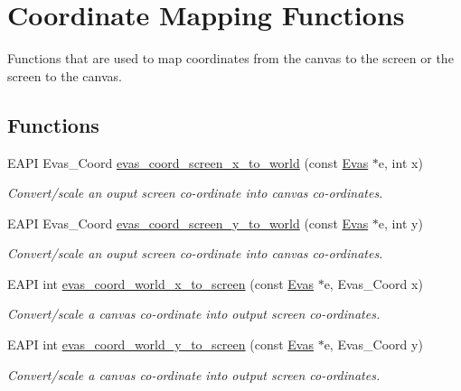 \section{Coordinate Mapping Functions}
\label{group__Evas__Coord__Mapping__Group}


Functions that are used to map coordinates from the canvas to the screen or the screen to the canvas.  


\subsection*{Functions}
\begin{DoxyCompactItemize}
\item 
EAPI Evas\_\-Coord \hyperlink{group__Evas__Coord__Mapping__Group_gab435c4e98554a4c6b934840a38d96051}{evas\_\-coord\_\-screen\_\-x\_\-to\_\-world} (const \hyperlink{group__Evas__Canvas_ga5ff87cc4ce6bc43e3b640a6d37f73043}{Evas} $\ast$e, int x)
\begin{DoxyCompactList}\small\item\em Convert/scale an ouput screen co-\/ordinate into canvas co-\/ordinates. \item\end{DoxyCompactList}\item 
EAPI Evas\_\-Coord \hyperlink{group__Evas__Coord__Mapping__Group_gac69db230ec0bd06f683e62665abe5df2}{evas\_\-coord\_\-screen\_\-y\_\-to\_\-world} (const \hyperlink{group__Evas__Canvas_ga5ff87cc4ce6bc43e3b640a6d37f73043}{Evas} $\ast$e, int y)
\begin{DoxyCompactList}\small\item\em Convert/scale an ouput screen co-\/ordinate into canvas co-\/ordinates. \item\end{DoxyCompactList}\item 
EAPI int \hyperlink{group__Evas__Coord__Mapping__Group_ga3e4f9f6af852df00de8c180f2e3919e9}{evas\_\-coord\_\-world\_\-x\_\-to\_\-screen} (const \hyperlink{group__Evas__Canvas_ga5ff87cc4ce6bc43e3b640a6d37f73043}{Evas} $\ast$e, Evas\_\-Coord x)
\begin{DoxyCompactList}\small\item\em Convert/scale a canvas co-\/ordinate into output screen co-\/ordinates. \item\end{DoxyCompactList}\item 
EAPI int \hyperlink{group__Evas__Coord__Mapping__Group_ga6c80c5dd33180044bcd200bb4739a2b8}{evas\_\-coord\_\-world\_\-y\_\-to\_\-screen} (const \hyperlink{group__Evas__Canvas_ga5ff87cc4ce6bc43e3b640a6d37f73043}{Evas} $\ast$e, Evas\_\-Coord y)
\begin{DoxyCompactList}\small\item\em Convert/scale a canvas co-\/ordinate into output screen co-\/ordinates. \item\end{DoxyCompactList}\end{DoxyCompactItemize}


